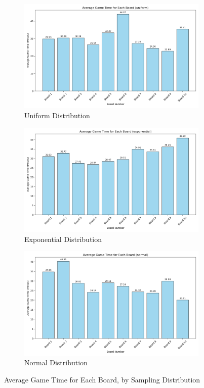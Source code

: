 \documentclass[12pt]{report}
\begin{document}
	\begin{figure}[h]
		\centering
		\begin{subfigure}[b]{0.32\textwidth}
			\includegraphics[width=\linewidth]{../withLength/FinalSampling/board_averages_uniform}
			\caption{Uniform Distribution}
		\end{subfigure}
		\hfill
		\begin{subfigure}[b]{0.32\textwidth}
			\includegraphics[width=\linewidth]{../withLength/FinalSampling/board_averages_exponential}
			\caption{Exponential Distribution}
		\end{subfigure}
		\hfill
		\begin{subfigure}[b]{0.32\textwidth}
			\includegraphics[width=\linewidth]{../withLength/FinalSampling/board_averages_normal}
			\caption{Normal Distribution}
		\end{subfigure}
		\caption{Average Game Time for Each Board, by Sampling Distribution}
	\end{figure}
\end{document}
